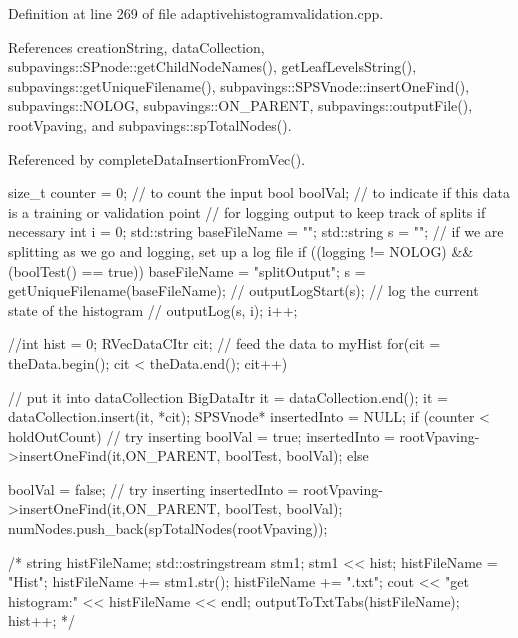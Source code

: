 \-Definition at line 269 of file adaptivehistogramvalidation.\-cpp.



\-References creation\-String, data\-Collection, subpavings\-::\-S\-Pnode\-::get\-Child\-Node\-Names(), get\-Leaf\-Levels\-String(), subpavings\-::get\-Unique\-Filename(), subpavings\-::\-S\-P\-S\-Vnode\-::insert\-One\-Find(), subpavings\-::\-N\-O\-L\-O\-G, subpavings\-::\-O\-N\-\_\-\-P\-A\-R\-E\-N\-T, subpavings\-::output\-File(), root\-Vpaving, and subpavings\-::sp\-Total\-Nodes().



\-Referenced by complete\-Data\-Insertion\-From\-Vec().


\begin{DoxyCode}
{
    size_t counter = 0;    // to count the input
    bool boolVal; // to  indicate if this data is a training or validation
       point
    // for logging output to keep track of splits if necessary
    int i = 0;
    std::string baseFileName = "";
    std::string s = "";
    // if we are splitting as we go and logging, set up a log file
    if ((logging != NOLOG) && (boolTest() == true)) {
        baseFileName = "splitOutput";
        s = getUniqueFilename(baseFileName);
       // outputLogStart(s);
        // log the current state of the histogram
      //  outputLog(s, i);
        i++;
    }
   
   //int hist = 0;
   RVecDataCItr cit;
    // feed the data to myHist
    for(cit = theData.begin(); cit < theData.end(); cit++) {
        // put it into dataCollection
        BigDataItr it = dataCollection.end();
        it = dataCollection.insert(it, *cit);
        SPSVnode* insertedInto = NULL;
        if (counter < holdOutCount) {
          // try inserting 
          boolVal = true;
          insertedInto =
                rootVpaving->insertOneFind(it,ON_PARENT, boolTest, boolVal);
        }
        else {
         boolVal = false;
      // try inserting
         insertedInto =
                rootVpaving->insertOneFind(it,ON_PARENT, boolTest, boolVal);
           numNodes.push_back(spTotalNodes(rootVpaving));
           
           /* 
           string histFileName;
           std::ostringstream stm1;
           stm1 << hist;
           histFileName = "Hist";
           histFileName += stm1.str();
           histFileName += ".txt";
           cout << "get histogram:" << histFileName << endl;
           outputToTxtTabs(histFileName);     
           hist++;    
           */     
      }

}}
\end{DoxyCode}
